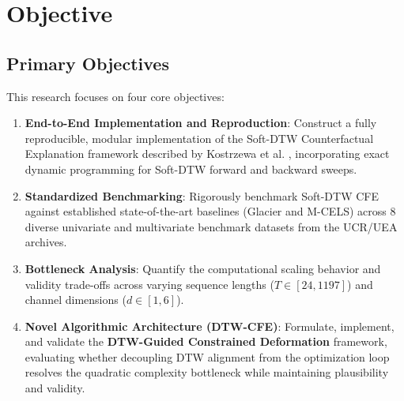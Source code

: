 \documentclass[11pt,a4paper]{report}
\begin{document}
\chapter{Objective}

\section{Primary Objectives}
This research focuses on four core objectives:
\begin{enumerate}
    \item \textbf{End-to-End Implementation and Reproduction}: Construct a fully reproducible, modular implementation of the Soft-DTW Counterfactual Explanation framework described by Kostrzewa et al. \cite{kostrzewa2026towards}, incorporating exact dynamic programming for Soft-DTW forward and backward sweeps.
    \item \textbf{Standardized Benchmarking}: Rigorously benchmark Soft-DTW CFE against established state-of-the-art baselines (Glacier and M-CELS) across 8 diverse univariate and multivariate benchmark datasets from the UCR/UEA archives.
    \item \textbf{Bottleneck Analysis}: Quantify the computational scaling behavior and validity trade-offs across varying sequence lengths ($T \in [24, 1197]$) and channel dimensions ($d \in [1, 6]$).
    \item \textbf{Novel Algorithmic Architecture (DTW-CFE)}: Formulate, implement, and validate the \textbf{DTW-Guided Constrained Deformation} framework, evaluating whether decoupling DTW alignment from the optimization loop resolves the quadratic complexity bottleneck while maintaining plausibility and validity.
\end{enumerate}
\end{document}
